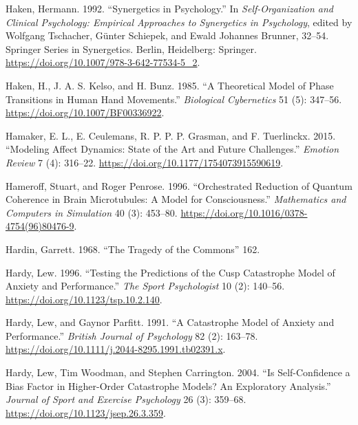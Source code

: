 \documentclass[
  a4paper,
  DIV=11,
  numbers=noendperiod,
  oneside]{scrreprt}
\newlength{\cslhangindent}
\newlength{\cslentryspacingunit} %
\newenvironment{CSLReferences}[2] %
 {%
  \setlength{\parindent}{0pt}
  \ifodd #1
  \let\oldpar\par
  \def\par{\hangindent=\cslhangindent\oldpar}
  \fi
  \setlength{\parskip}{#2\cslentryspacingunit}
 }%
 {}
\begin{document}
\begin{CSLReferences}{1}{0}
\leavevmode{}%
Haken, Hermann. 1992. {``Synergetics in {Psychology}.''} In
\emph{Self-{Organization} and {Clinical Psychology}: {Empirical
Approaches} to {Synergetics} in {Psychology}}, edited by Wolfgang
Tschacher, Günter Schiepek, and Ewald Johannes Brunner, 32--54. Springer
{Series} in {Synergetics}. {Berlin, Heidelberg}: {Springer}.
\url{https://doi.org/10.1007/978-3-642-77534-5_2}.

\leavevmode{}%
Haken, H., J. A. S. Kelso, and H. Bunz. 1985. {``A Theoretical Model of
Phase Transitions in Human Hand Movements.''} \emph{Biological
Cybernetics} 51 (5): 347--56. \url{https://doi.org/10.1007/BF00336922}.

\leavevmode{}%
Hamaker, E. L., E. Ceulemans, R. P. P. P. Grasman, and F. Tuerlinckx.
2015. {``Modeling {Affect Dynamics}: {State} of the {Art} and {Future
Challenges}.''} \emph{Emotion Review} 7 (4): 316--22.
\url{https://doi.org/10.1177/1754073915590619}.

\leavevmode{}%
Hameroff, Stuart, and Roger Penrose. 1996. {``Orchestrated Reduction of
Quantum Coherence in Brain Microtubules: {A} Model for Consciousness.''}
\emph{Mathematics and Computers in Simulation} 40 (3): 453--80.
\url{https://doi.org/10.1016/0378-4754(96)80476-9}.

\leavevmode{}%
Hardin, Garrett. 1968. {``The {Tragedy} of the {Commons}''} 162.

\leavevmode{}%
Hardy, Lew. 1996. {``Testing the {Predictions} of the {Cusp Catastrophe
Model} of {Anxiety} and {Performance}.''} \emph{The Sport Psychologist}
10 (2): 140--56. \url{https://doi.org/10.1123/tsp.10.2.140}.

\leavevmode{}%
Hardy, Lew, and Gaynor Parfitt. 1991. {``A Catastrophe Model of Anxiety
and Performance.''} \emph{British Journal of Psychology} 82 (2):
163--78. \url{https://doi.org/10.1111/j.2044-8295.1991.tb02391.x}.

\leavevmode{}%
Hardy, Lew, Tim Woodman, and Stephen Carrington. 2004. {``Is
Self-Confidence a Bias Factor in Higher-Order Catastrophe Models? An
Exploratory Analysis.''} \emph{Journal of Sport and Exercise Psychology}
26 (3): 359--68. \url{https://doi.org/10.1123/jsep.26.3.359}.


\end{CSLReferences}
\end{document}
